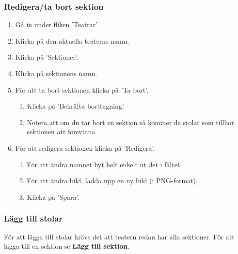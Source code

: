 \documentclass[a4paper, twoside, 11pt, titlepage]{article}
\begin{document}
		\subsubsection{Redigera/ta bort sektion}


		\begin{enumerate}
		\item Gå in under fliken 'Teatrar'

		\item Klicka på den aktuella teaterns namn.

		\item Klicka på 'Sektioner'.

		\item Klicka på sektionens namn.

		\item För att ta bort sektionen klicka på 'Ta bort'.

		\begin{enumerate}
		\item Klicka på 'Bekräfta borttagning'.

		\item Notera att om du tar bort en sektion så kommer de stolar som tillhör sektionen att försvinna.
		\end{enumerate}

		\item För att redigera sektionen klicka på 'Redigera'.

		\begin{enumerate}
		\item För att ändra namnet byt helt enkelt ut det i fältet.

		\item För att ändra bild, ladda upp en ny bild (i PNG-format).

		\item Klicka på 'Spara'.
		\end{enumerate}
		\end{enumerate}

		\subsubsection{Lägg till stolar}


		För att lägga till stolar krävs det att teatern redan har alla sektioner. För att lägga till en sektion se \textbf{Lägg till sektion}.
\end{document}
